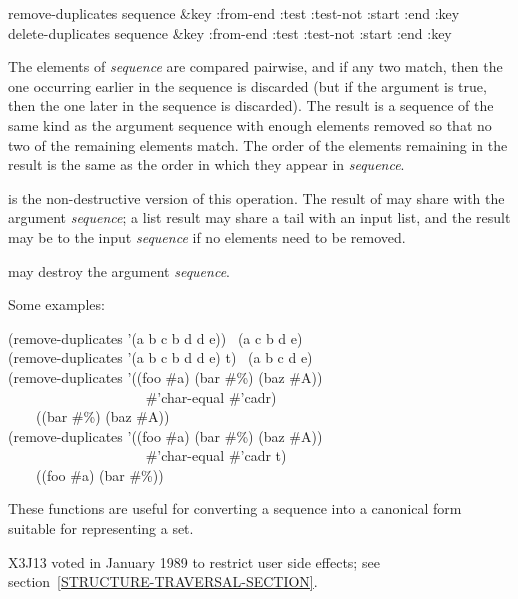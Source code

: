 \begin{defun}[Function]
remove-duplicates sequence &key :from-end :test :test-not :start :end :key \\
delete-duplicates sequence &key :from-end :test :test-not :start :end :key

The elements of \emph{sequence} are compared pairwise, and if any two match,
then the one occurring earlier in the sequence
is discarded (but if the  argument is true, then the one
later in the sequence is discarded).
The result is a sequence of the same kind as the
argument sequence with enough elements removed so that no two of the remaining
elements match.  The order of the elements remaining in the result
is the same as the order in which they appear in \emph{sequence}.

 is the non-destructive version
of this operation.
The result of  may share
with the argument \emph{sequence}; a list result may share a tail
with an input list, and the result may be  to the input \emph{sequence}
if no elements need to be removed.

 may destroy the argument \emph{sequence}.

Some examples:
\begin{lisp}
(remove-duplicates '(a b c b d d e)) \EV\ (a c b d e) \\
(remove-duplicates '(a b c b d d e)  t) \EV\ (a b c d e) \\
(remove-duplicates '((foo \#{\Xbackslash}a) (bar \#{\Xbackslash}\%) (baz \#{\Xbackslash}A)) \\
~~~~~~~~~~~~~~~~~~~ \#'char-equal  \#'cadr) \\
~~~\EV\ ((bar \#{\Xbackslash}\%) (baz \#{\Xbackslash}A)) \\
(remove-duplicates '((foo \#{\Xbackslash}a) (bar \#{\Xbackslash}\%) (baz \#{\Xbackslash}A)) \\
~~~~~~~~~~~~~~~~~~~ \#'char-equal  \#'cadr  t) \\
~~~\EV\ ((foo \#{\Xbackslash}a) (bar \#{\Xbackslash}\%))
\end{lisp}

These functions are useful for converting a sequence into a canonical
form suitable for representing a set.

\begin{new}
X3J13 voted in January 1989
to restrict user side effects; see section~\ref{STRUCTURE-TRAVERSAL-SECTION}.
\end{new}


\end{defun}
